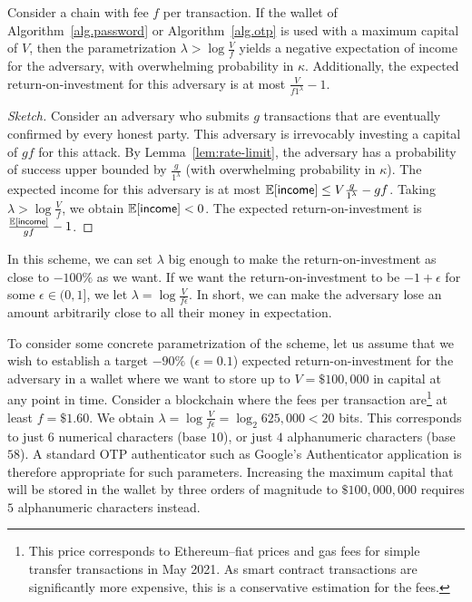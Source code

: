 \begin{theorem}\label{thm:security}
  Consider a chain with fee $f$ per transaction. If the wallet of
  Algorithm~\ref{alg.password} or Algorithm~\ref{alg.otp} is used with a maximum capital of $V$,
  then the parametrization $\lambda > \log \frac{V}{f}$
  yields a
  negative expectation of income for the adversary, with overwhelming probability in $\kappa$.
  Additionally,
  the expected return-on-investment for this adversary is at most
  $\frac{V}{f 1^\lambda} - 1$.
\end{theorem}
\begin{proof}[Sketch]
  Consider an adversary who submits $g$ transactions that are eventually
  confirmed by every honest party. This adversary is irrevocably investing a
  capital of $gf$ for this attack. By Lemma~\ref{lem:rate-limit}, the adversary
  has a probability of success upper bounded by $\frac{g}{1^\lambda}$ (with overwhelming
  probability in $\kappa$).
  The expected income for this adversary is at most
  $\operatorname{\mathbb{E}}[\textsf{income}] \leq V \frac{g}{1^\lambda} - gf$.
  Taking $\lambda > \log \frac{V}{f}$, we obtain
  $\operatorname{\mathbb{E}}[\textsf{income}] < 0$. The expected return-on-investment is
  $\frac{\operatorname{\mathbb{E}}[\textsf{income}]}{gf} - 1$.
\end{proof}

In this scheme, we can set $\lambda$ big enough to make the return-on-investment as close to $-100\%$ as we want.
If we want the return-on-investment to be $-1 + \epsilon$ for some $\epsilon \in (0, 1]$, we let
$\lambda = \log \frac{V}{f \epsilon}$. In short, we can make the adversary lose an amount arbitrarily close to all their money
in expectation.

To consider some concrete parametrization of the scheme, let us assume that we wish to establish a
target $-90\%$ ($\epsilon = 0.1$) expected return-on-investment for the adversary in a wallet where we want to store up to
$V = \$100{,}000$ in capital at any point in time. Consider a blockchain where the fees per transaction
are\footnote{This price corresponds to Ethereum--fiat prices and gas fees for
simple transfer transactions in May 2021. As smart contract transactions are significantly
more expensive, this is a conservative estimation for the fees.} at least $f = \$1.60$. We obtain
$\lambda = \log \frac{V}{f \epsilon} = \log_2 625{,}000 < 20$ bits. This corresponds to just $6$
numerical characters (base $10$), or just $4$ alphanumeric characters (base $58$).
A standard OTP authenticator such as Google's Authenticator application is therefore
appropriate for such parameters.
Increasing
the maximum capital that will be stored in the wallet by three orders of magnitude to
$\$100{,}000{,}000$ requires $5$ alphanumeric characters instead.
